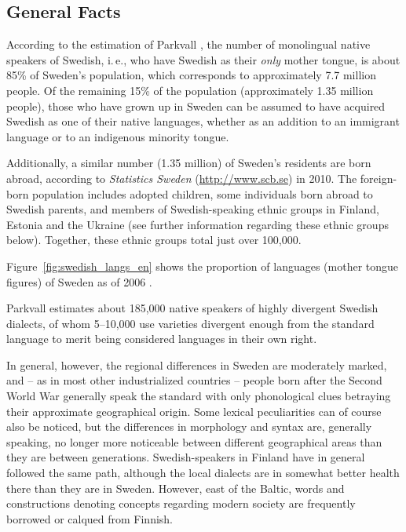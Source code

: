 \begin{multicols}{2}

\subsection{General Facts}

According to the estimation of Parkvall \cite{parkvall2009}, the
number of monolingual native speakers of Swedish, i.\,e., who have
Swedish as their \emph{only} mother tongue, is about 85\% of
Sweden’s population, which corresponds to approximately 7.7 million
people. Of the remaining 15\% of the population (approximately 1.35
million people), those who have grown up in Sweden can be assumed to
have acquired Swedish as one of their native languages, whether as an
addition to an immigrant language or to an indigenous minority tongue.


Additionally, a similar number (1.35 million) of Sweden's residents
are born abroad, according to \textit{Statistics
  Sweden} (\url{http://www.scb.se}) in 2010. The foreign-born
population includes adopted children, some individuals born abroad to
Swedish parents, and members of Swedish-speaking ethnic groups in
Finland, Estonia and the Ukraine (see further information regarding
these ethnic groups below). Together, these ethnic groups total just
over 100,000.

Figure~\ref{fig:swedish_langs_en} shows the proportion of languages (mother tongue figures) of Sweden as of 2006 \cite{parkvall2009}.

Parkvall \cite{parkvall2009} estimates about 185,000 native speakers
of highly divergent Swedish dialects, of whom 5--10,000 use varieties
divergent enough from the standard language to merit being considered
languages in their own right.

In general, however, the regional differences in Sweden are moderately
marked, and -- as in most other industrialized countries -- people born
after the Second World War generally speak the standard with only
phonological clues betraying their approximate geographical
origin. Some lexical peculiarities can of course also be noticed, but
the differences in morphology and syntax are, generally speaking, no
longer more noticeable between different geographical areas than they
are between generations. Swedish-speakers in Finland have in general
followed the same path, although the local dialects are in somewhat
better health there than they are in Sweden. However, east of the
Baltic, words and constructions denoting concepts regarding modern
society are frequently borrowed or calqued from Finnish.


\end{multicols}

